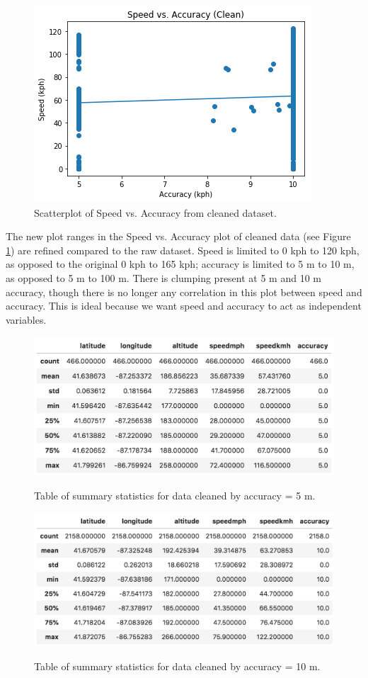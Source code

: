 \documentclass[12pt]{article}
\begin{document}
\begin{figure}
	\centering
	\includegraphics[scale= 0.8]{speed_vs_accuracy_clean.png}
	\caption{Scatterplot of Speed vs. Accuracy from cleaned dataset.}
	\label{speed_vs_accuracy_clean}
\end{figure}

The new plot ranges in the Speed vs. Accuracy plot of cleaned data (see Figure \ref{speed_vs_accuracy_clean}) are refined compared to the raw dataset. Speed is limited to 0 kph to 120 kph, as opposed to the original 0 kph to 165 kph; accuracy is limited to 5 m to 10 m, as opposed to 5 m to 100 m. There is clumping present at 5 m and 10 m accuracy, though there is no longer any correlation in this plot between speed and accuracy. This is ideal because we want speed and accuracy to act as independent variables. 

\begin{figure}
	\centering
		\caption{Table of summary statistics for data cleaned by accuracy = 5 m.}
	\includegraphics[scale= 0.8]{acc5_summary.png}
	\label{acc5_summary}
\end{figure}

\begin{figure}
	\centering
	\caption{Table of summary statistics for data cleaned by accuracy = 10 m.}
	\includegraphics[scale= 0.8]{acc10_summary.png}
	\label{acc10_summary}
\end{figure}
\end{document}
